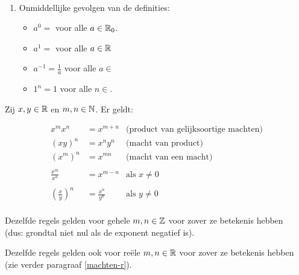 \documentclass{ximera}
\begin{document}
\begin{remark} \ 
	
	\begin{enumerate}
	\item Onmiddellijke gevolgen van de definities:
			\begin{itemize}
			\item $a^0=$ voor alle $a\in\mathbb{R}_0$.
			\item $a^1=$ voor alle $a\in\mathbb{R}$
			\item $a^{-1}=\frac{1}{a}$ voor alle $a\in$\wordChoice{\choice{$\R$}\choice{$\Rplus$}\choice[correct]{$\Rnul$}}
			\item $1^n=1$ voor alle $n\in$\wordChoice{\choice{$\N$}\choice{$\R$}\choice[correct]{$\Z$}}.
		\end{itemize}
\end{enumerate} 
\end{remark}

\begin{proposition}
	Zij $x,y\in\mathbb{R}$ en $m,n\in\mathbb{N}$. Er geldt:
{
	\savebox\strutbox{$\vphantom{\dfrac11^n}$}   %
\begin{align*}
	x^{m}x^{n}  & = x^{m+n}            & \text{(product van gelijksoortige machten)} \\
	(xy)^n      & = x^ny^n             & \text{(macht van product)}\\
	\left(x^{m}\right)^{n} & = x^{mn}  & \text{(macht van een macht)} \\
	\\
	\frac{x^{m}}{x^{n}}    & = x^{m-n} & \text{als }x\neq0\\
	\\
	\left(\frac{x}{y}\right)^{n} & = \frac{x^{n}}{y^{n}} & \text{als }y\neq0\\
\end{align*}

	Dezelfde regels gelden voor gehele $m,n\in\mathbb{Z}$ voor zover ze betekenis hebben 
	\\ (dus: grondtal niet nul als de exponent negatief is).
	
	Dezelfde regels gelden ook voor reële $m,n\in\mathbb{R}$ voor zover ze betekenis hebben
	\\ (zie verder paragraaf \ref{machten-r}).
}
\end{proposition}
\end{document}

